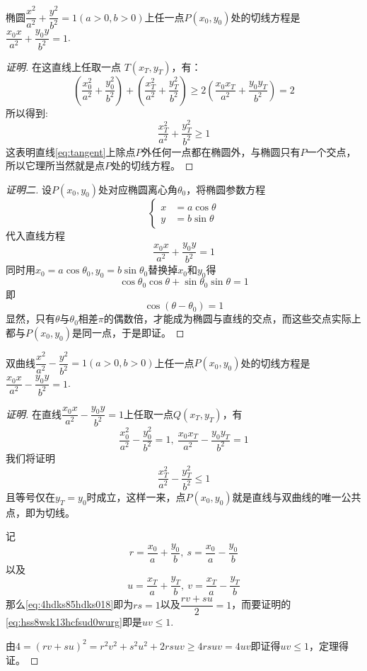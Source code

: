 \begin{theorem}
  椭圆$\dfrac{x^2}{a^2}+\dfrac{y^2}{b^2}=1(a>0,b>0)$上任一点$P(x_0,y_0)$处的切线方程是$\dfrac{x_0x}{a^2}+\dfrac{y_0y}{b^2}=1$.
\end{theorem}

\begin{proof}[证明]
在这直线上任取一点 $T(x_T,y_T)$，有：
\begin{equation}
\left(\frac{x_0^2}{a^2}+\frac{y_0^2}{b^2}\right)+\left(\frac{x_T^2}{a^2}+\frac{y_T^2}{b^2}\right) \geqslant 2\left(\frac{x_0x_T}{a^2}+\frac{y_0y_T}{b^2}\right)=2
\end{equation}
所以得到:
\begin{equation}
\frac{x_T^2}{a^2}+\frac{y_T^2}{b^2} \geqslant 1
\end{equation}
这表明直线\ref{eq:tangent}上除点$P$外任何一点都在椭圆外，与椭圆只有$P$一个交点，所以它理所当然就是点$P$处的切线方程。
\end{proof}

\begin{proof}[证明二]
  设$P(x_0,y_0)$处对应椭圆离心角$\theta_0$，将椭圆参数方程
\[ 
\begin{cases}
x & = a \cos{\theta} \\
y & = b \sin{\theta}
\end{cases}
\]
代入直线方程
\[ \frac{x_0x}{a^2} + \frac{y_0y}{b^2} = 1 \]
同时用$x_0=a\cos{\theta_0},y_0=b\sin{\theta_0}$替换掉$x_0$和$y_0$得
\[ \cos{\theta_0}\cos{\theta}+\sin{\theta_0}\sin{\theta}=1 \]
即
\[ \cos{(\theta-\theta_0)} = 1 \]
显然，只有$\theta$与$\theta_0$相差$\pi$的偶数倍，才能成为椭圆与直线的交点，而这些交点实际上都与$P(x_0,y_0)$是同一点，于是即证。
\end{proof}

\begin{theorem}
  双曲线$\dfrac{x^2}{a^2}-\dfrac{y^2}{b^2}=1(a>0,b>0)$上任一点$P(x_0,y_0)$处的切线方程是$\dfrac{x_0x}{a^2}-\dfrac{y_0y}{b^2}=1$.
\end{theorem}

\begin{proof}[证明]
  在直线$\dfrac{x_0x}{a^2}-\dfrac{y_0y}{b^2}=1$上任取一点$Q(x_T,y_T)$，有
  \begin{equation}
    \label{eq:4hdks85hdks018}
   \frac{x_0^2}{a^2}-\frac{y_0^2}{b^2}=1, \  \frac{x_0x_T}{a^2}-\frac{y_0y_T}{b^2}=1 
  \end{equation}
  我们将证明
  \begin{equation}
    \label{eq:hss8wsk13hcfsud0wurg}
    \frac{x_T^2}{a^2}-\frac{y_T^2}{b^2} \leqslant 1  
  \end{equation}
  且等号仅在$y_T=y_0$时成立，这样一来，点$P(x_0,y_0)$就是直线与双曲线的唯一公共点，即为切线。

  记
  \[ r=\frac{x_0}{a}+\frac{y_0}{b}, \  s=\frac{x_0}{a}-\frac{y_0}{b} \]
  以及
  \[ u=\frac{x_T}{a}+\frac{y_T}{b}, \  v=\frac{x_T}{a}-\frac{y_T}{b} \]
  那么\autoref{eq:4hdks85hdks018}即为$rs=1$以及$\dfrac{rv+su}{2}=1$，而要证明的\autoref{eq:hss8wsk13hcfsud0wurg}即是$uv\leqslant 1$.

  由$4=(rv+su)^2=r^2v^2+s^2u^2+2rsuv \geqslant 4rsuv= 4uv$即证得$uv \leqslant 1$，定理得证。
\end{proof}

